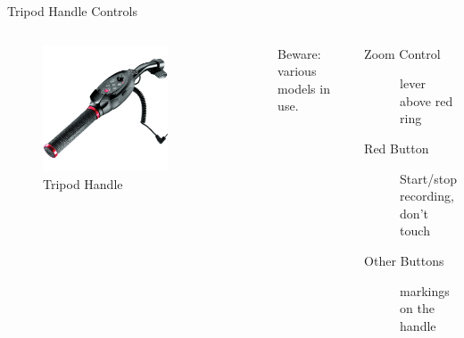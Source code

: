 \documentclass[aspectratio=169]{beamer}
\begin{document}
\begin{frame}{Tripod Handle Controls}
	\begin{columns}[T,onlytextwidth]
	\begin{figure} 
		\centering
		\includegraphics[width=0.7\textwidth]{images/tripod-handle.jpeg}
		\caption{Tripod Handle}
	\end{figure}

	Beware: various models in use.
	\begin{description}
		\item[Zoom Control] lever above red ring
		\item[Red Button] Start/stop recording, don't touch
		\item[Other Buttons] markings on the handle
    \end{description}

	\end{columns}
\end{frame}
\end{document}
